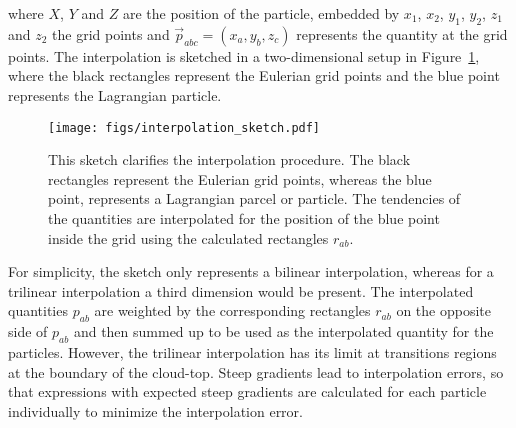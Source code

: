 \documentclass[12pt]{article}
\begin{document}
where $X$, $Y$ and $Z$ are the position of the particle, embedded by $x_{1}$, $x_{2}$, $y_{1}$, $y_{2}$, $z_{1}$ and $z_{2}$ the grid points and $\vec{p}_{abc}=(x_a, y_b, z_c)$ represents the quantity at the grid points. The interpolation is sketched in a two-dimensional setup in Figure~\ref{fig:interpolation_sketch}, where the black rectangles represent the Eulerian grid points and the blue point represents the Lagrangian particle.
\begin{figure}[htbp]
	\centering
		\texttt{[image: figs/interpolation\_sketch.pdf]}
	\caption[Interpolation sketch]{This sketch clarifies the interpolation procedure. The black rectangles represent the Eulerian grid points, whereas the blue point, represents a Lagrangian parcel or particle. The tendencies of the quantities are interpolated for the position of the blue point inside the grid using the calculated rectangles $r_{ab}$.}
	\label{fig:interpolation_sketch}
\end{figure}
For simplicity, the sketch only represents a bilinear interpolation, whereas for a trilinear interpolation a third dimension would be present. The interpolated quantities $p_{ab}$ are weighted by the corresponding rectangles $r_{ab}$ on the opposite side of $p_{ab}$ and then summed up to be used as the interpolated quantity for the particles. \newline
However, the trilinear interpolation has its limit at transitions regions at the boundary of the cloud-top. Steep gradients lead to interpolation errors, so that expressions with expected steep gradients are calculated for each particle individually to minimize the interpolation error. 
\end{document}
